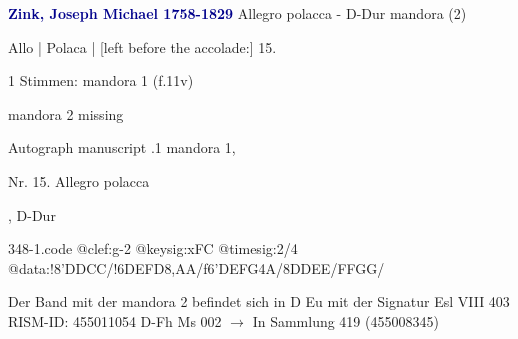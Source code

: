 \documentclass[twocolumn]{book}
\begin{document}
\newline \par \vspace{7pt} \textcolor{darkblue}{\textbf{Zink, Joseph Michael  1758-1829}}
\newline Allegro polacca - D-Dur
\newline mandora (2)
\newline \begin{itshape}[f.11v, at left:] Allo | Polaca | [left before the accolade:] 15.\end{itshape} 
\newline \textcolor{darkblue}{}  1 Stimmen: mandora 1  (f.11v)
\newline \begin{small} mandora 2 missing\end{small} 
\newline Autograph manuscript
.1  mandora 1, \begin{itshape}Nr. 15. Allegro polacca\end{itshape}, D-Dur  
\begin{filecontents*}{348-1.code}
@clef:g-2
@keysig:xFC
@timesig:2/4
@data:!8'DDCC/!6DEFD{8,AA}/f6'DEFG4A/8DDEE/FFGG/
\end{filecontents*}
\newline
%
\newline Der Band mit der mandora 2 befindet sich in D Eu mit der Signatur Esl VIII 403
\newline RISM-ID: 455011054
\newline D-Fh  Ms 002
\newline $\rightarrow$ In Sammlung 419 (455008345)
      
\end{document}
